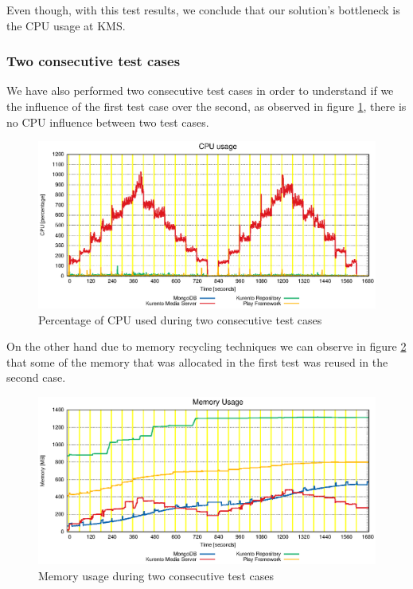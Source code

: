 Even though, with this test results, we conclude that our solution's bottleneck is the \ac{CPU} usage at \ac{KMS}.

\subsubsection{Two consecutive test cases}


We have also performed two consecutive test cases in order to understand if we the influence of the first test case over the second, as observed in figure \ref{fig:test_two_times_cpu}, there is no \ac{CPU} influence between two test cases.


\begin{figure}
  \centering
  \includegraphics[width=\textwidth]{stats/test_two_times_cpu.eps}
  \caption{Percentage of CPU used during two consecutive test cases}
  \label{fig:test_two_times_cpu}
\end{figure}

On the other hand due to memory recycling techniques we can observe in figure \ref{fig:test_two_times_mem} that some of the memory that was allocated in the first test was reused in the second case.


\begin{figure}
  \centering
  \includegraphics[width=\textwidth]{stats/test_two_times_mem.eps}
  \caption{Memory usage during two consecutive test cases}
  \label{fig:test_two_times_mem}
\end{figure}


